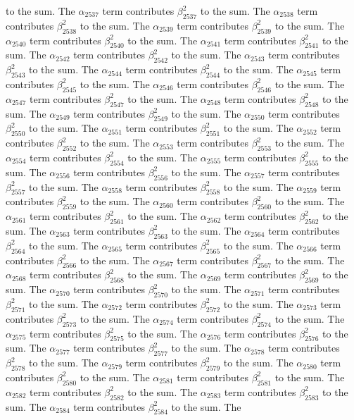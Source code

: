 \begin{lemma}
to the sum. The $\alpha_{2537}$ term contributes $\beta_{2537}^{2}$ to the sum. The $\alpha_{2538}$ term contributes $\beta_{2538}^{2}$ to the sum. The $\alpha_{2539}$ term contributes $\beta_{2539}^{2}$ to the sum. The $\alpha_{2540}$ term contributes $\beta_{2540}^{2}$ to the sum. The $\alpha_{2541}$ term contributes $\beta_{2541}^{2}$ to the sum. The $\alpha_{2542}$ term contributes $\beta_{2542}^{2}$ to the sum. The $\alpha_{2543}$ term contributes $\beta_{2543}^{2}$ to the sum. The $\alpha_{2544}$ term contributes $\beta_{2544}^{2}$ to the sum. The $\alpha_{2545}$ term contributes $\beta_{2545}^{2}$ to the sum. The $\alpha_{2546}$ term contributes $\beta_{2546}^{2}$ to the sum. The $\alpha_{2547}$ term contributes $\beta_{2547}^{2}$ to the sum. The $\alpha_{2548}$ term contributes $\beta_{2548}^{2}$ to the sum. The $\alpha_{2549}$ term contributes $\beta_{2549}^{2}$ to the sum. The $\alpha_{2550}$ term contributes $\beta_{2550}^{2}$ to the sum. The $\alpha_{2551}$ term contributes $\beta_{2551}^{2}$ to the sum. The $\alpha_{2552}$ term contributes $\beta_{2552}^{2}$ to the sum. The $\alpha_{2553}$ term contributes $\beta_{2553}^{2}$ to the sum. The $\alpha_{2554}$ term contributes $\beta_{2554}^{2}$ to the sum. The $\alpha_{2555}$ term contributes $\beta_{2555}^{2}$ to the sum. The $\alpha_{2556}$ term contributes $\beta_{2556}^{2}$ to the sum. The $\alpha_{2557}$ term contributes $\beta_{2557}^{2}$ to the sum. The $\alpha_{2558}$ term contributes $\beta_{2558}^{2}$ to the sum. The $\alpha_{2559}$ term contributes $\beta_{2559}^{2}$ to the sum. The $\alpha_{2560}$ term contributes $\beta_{2560}^{2}$ to the sum. The $\alpha_{2561}$ term contributes $\beta_{2561}^{2}$ to the sum. The $\alpha_{2562}$ term contributes $\beta_{2562}^{2}$ to the sum. The $\alpha_{2563}$ term contributes $\beta_{2563}^{2}$ to the sum. The $\alpha_{2564}$ term contributes $\beta_{2564}^{2}$ to the sum. The $\alpha_{2565}$ term contributes $\beta_{2565}^{2}$ to the sum. The $\alpha_{2566}$ term contributes $\beta_{2566}^{2}$ to the sum. The $\alpha_{2567}$ term contributes $\beta_{2567}^{2}$ to the sum. The $\alpha_{2568}$ term contributes $\beta_{2568}^{2}$ to the sum. The $\alpha_{2569}$ term contributes $\beta_{2569}^{2}$ to the sum. The $\alpha_{2570}$ term contributes $\beta_{2570}^{2}$ to the sum. The $\alpha_{2571}$ term contributes $\beta_{2571}^{2}$ to the sum. The $\alpha_{2572}$ term contributes $\beta_{2572}^{2}$ to the sum. The $\alpha_{2573}$ term contributes $\beta_{2573}^{2}$ to the sum. The $\alpha_{2574}$ term contributes $\beta_{2574}^{2}$ to the sum. The $\alpha_{2575}$ term contributes $\beta_{2575}^{2}$ to the sum. The $\alpha_{2576}$ term contributes $\beta_{2576}^{2}$ to the sum. The $\alpha_{2577}$ term contributes $\beta_{2577}^{2}$ to the sum. The $\alpha_{2578}$ term contributes $\beta_{2578}^{2}$ to the sum. The $\alpha_{2579}$ term contributes $\beta_{2579}^{2}$ to the sum. The $\alpha_{2580}$ term contributes $\beta_{2580}^{2}$ to the sum. The $\alpha_{2581}$ term contributes $\beta_{2581}^{2}$ to the sum. The $\alpha_{2582}$ term contributes $\beta_{2582}^{2}$ to the sum. The $\alpha_{2583}$ term contributes $\beta_{2583}^{2}$ to the sum. The $\alpha_{2584}$ term contributes $\beta_{2584}^{2}$ to the sum. The 
\end{lemma}
